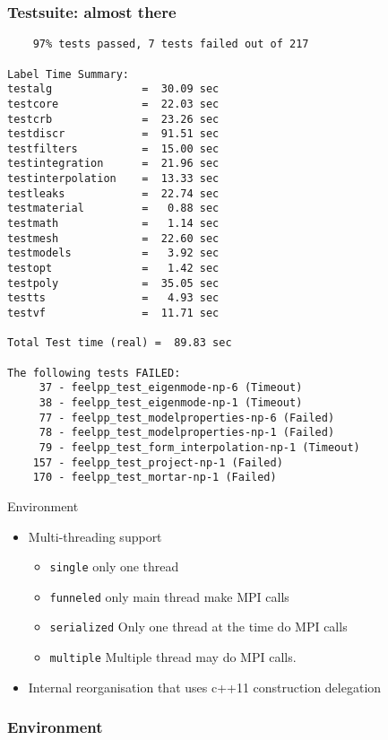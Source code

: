 \begin{frame}[fragile]
  \frametitle{Testsuite: almost there}
  \begin{verbatim}
    97% tests passed, 7 tests failed out of 217

Label Time Summary:
testalg              =  30.09 sec
testcore             =  22.03 sec
testcrb              =  23.26 sec
testdiscr            =  91.51 sec
testfilters          =  15.00 sec
testintegration      =  21.96 sec
testinterpolation    =  13.33 sec
testleaks            =  22.74 sec
testmaterial         =   0.88 sec
testmath             =   1.14 sec
testmesh             =  22.60 sec
testmodels           =   3.92 sec
testopt              =   1.42 sec
testpoly             =  35.05 sec
testts               =   4.93 sec
testvf               =  11.71 sec

Total Test time (real) =  89.83 sec

The following tests FAILED:
	 37 - feelpp_test_eigenmode-np-6 (Timeout)
	 38 - feelpp_test_eigenmode-np-1 (Timeout)
	 77 - feelpp_test_modelproperties-np-6 (Failed)
	 78 - feelpp_test_modelproperties-np-1 (Failed)
	 79 - feelpp_test_form_interpolation-np-1 (Timeout)
	157 - feelpp_test_project-np-1 (Failed)
	170 - feelpp_test_mortar-np-1 (Failed)
  \end{verbatim}
\end{frame}

\begin{frame}{Environment}
  \begin{itemize}
  \item Multi-threading support
    \begin{itemize}
    \item \texttt{single} only one thread
    \item \texttt{funneled} only main thread make MPI calls
    \item \texttt{serialized} Only one thread at the time do
      MPI calls
    \item \texttt{multiple} Multiple thread may do MPI calls.
    \end{itemize}
  \item Internal reorganisation that uses c++11 construction delegation
  \end{itemize}

\end{frame}
\begin{frame}
  \frametitle{Environment}
  \inputminted[fontsize=\scriptsize]{c++}{Codes/prudhomme/fud4/env.cpp}
\end{frame}

